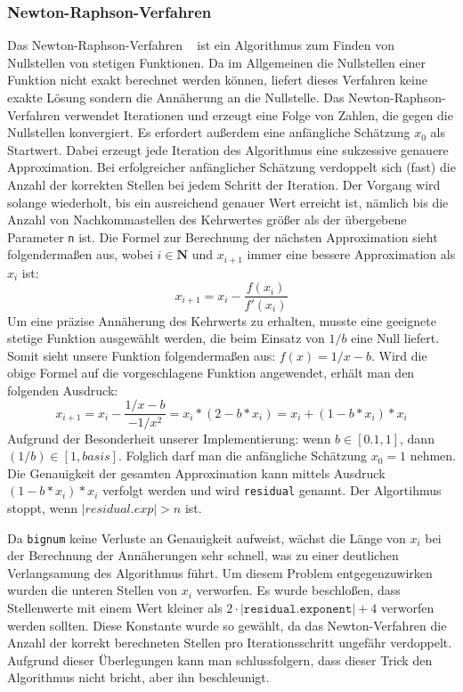\documentclass[course=erap]{aspdoc}
\begin{document}
\subsubsection{Newton-Raphson-Verfahren}
Das Newton-Raphson-Verfahren ~\cite{Newton-Raphson-Verfahren} ist ein Algorithmus  zum Finden von Nullstellen von stetigen Funktionen. Da im Allgemeinen die Nullstellen einer Funktion nicht exakt berechnet werden können, liefert dieses Verfahren keine exakte Lösung sondern die Annäherung an die Nullstelle. Das Newton-Raphson-Verfahren verwendet Iterationen und erzeugt eine Folge von Zahlen, die gegen die Nullstellen konvergiert. Es erfordert außerdem eine anfängliche Schätzung $x_{0}$ als Startwert. Dabei erzeugt jede Iteration des Algorithmus eine sukzessive genauere Approximation. Bei erfolgreicher anfänglicher Schätzung verdoppelt sich (fast) die Anzahl der korrekten Stellen bei jedem Schritt der Iteration. Der Vorgang wird solange wiederholt, bis ein ausreichend genauer Wert erreicht ist, nämlich bis die Anzahl von Nachkommastellen des Kehrwertes größer als der übergebene Parameter \texttt{n} ist. Die Formel zur Berechnung der nächsten Approximation sieht folgendermaßen aus, wobei $i\in\mathbf{N} $ und $x_{i + 1}$ immer eine bessere Approximation als $x_{i}$ ist: 
\begin{equation}
x_{i + 1} =  x_{i} - \frac{f(x_{i})}{f'(x_{i})} 
\label{eq:nächste Näherung}
\end{equation}
Um eine präzise Annäherung des Kehrwerts zu erhalten, musste eine geeignete stetige Funktion ausgewählt werden, die beim Einsatz von $1/b$ eine Null liefert. Somit sieht unsere Funktion folgendermaßen aus: $f(x) = 1/x - b$. Wird die obige Formel auf die vorgeschlagene Funktion angewendet, erhält man den folgenden Ausdruck: 
\begin{equation} x_{i + 1} = x_{i} - \frac{1/x-b}{-1/x^{2}} = x_{i} * (2 - b *  x_{i}) = x_{i} + (1 - b * x_{i}) * x_{i} 
\label{eq:Konvergenzformel}
\end{equation}
Aufgrund der Besonderheit unserer Implementierung: wenn $b \in [0.1, 1]$, dann $(1/b) \in [1, basis]$. Folglich darf man die anfängliche Schätzung $x_{0} = 1$ nehmen. Die Genauigkeit der gesamten Approximation kann mittels Ausdruck $(1 - b * x_{i}) * x_{i}$ verfolgt werden und wird \texttt{residual} genannt. Der Algortihmus stoppt, wenn $|residual.exp| > n$ ist. 

Da \texttt{bignum} keine Verluste an Genauigkeit aufweist, wächst die Länge von $x_{i}$ bei der Berechnung der Annäherungen sehr schnell, was zu einer deutlichen Verlangsamung des Algorithmus führt. Um diesem Problem entgegenzuwirken wurden die unteren Stellen von $x_{i}$ verworfen. Es wurde beschloßen, dass Stellenwerte mit einem Wert kleiner als $2 \cdot |\texttt{residual.exponent}| + 4$ verworfen werden sollten. Diese Konstante wurde so gewählt, da das Newton-Verfahren die Anzahl der korrekt berechneten Stellen pro Iterationsschritt ungefähr verdoppelt. Aufgrund dieser Überlegungen kann man schlussfolgern, dass dieser Trick den Algorithmus nicht bricht, aber ihn beschleunigt.
\end{document}
